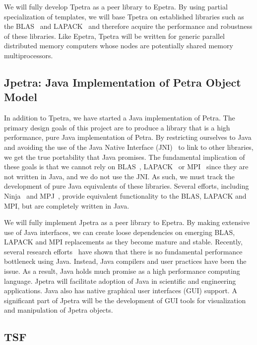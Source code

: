 \documentclass[12pt,strict]{SANDreport}
\begin{document}
We will fully develop Tpetra as a peer library to Epetra. By using partial
specialization of templates, we will base Tpetra on established libraries such as the
BLAS~\cite{BLAS1,BLAS2,BLAS3} and LAPACK~\cite{lapack} and therefore acquire the
performance and robustness of these libraries.
Like Epetra, Tpetra will be written for generic parallel distributed
memory computers whose nodes are
potentially shared memory multiprocessors.

\subsection{Jpetra: Java Implementation of Petra Object Model}

In addition to Tpetra, we have started a Java implementation of Petra.  The primary design
goals of this project are to produce a library that is a high performance, pure Java
implementation of Petra.  By restricting ourselves to Java and avoiding the use of the Java
Native Interface (JNI)~\cite{JNI-site} to link to other libraries, we
get the true portability that Java
promises.  The fundamental implication of these goals is that we cannot rely on
BLAS~\cite{BLAS1,BLAS2,BLAS3}, LAPACK~\cite{lapack} or MPI~\cite{MPI}
since they are not written in Java, and we do not use the JNI.
As such, we must track the development of pure Java equivalents of these libraries.  Several
efforts, including Ninja~\cite{MoreMidkGuptArtiWuAlma2001} and
MPJ~\cite{CarpGetoJuddSkjeFox2000}, provide equivalent functionality to the BLAS, LAPACK and
MPI, but are completely written in Java.

We will fully implement Jpetra as a peer library to Epetra.  By making extensive use of Java
interfaces, we can create loose dependencies on emerging BLAS, LAPACK and MPI replacements as
they become mature and stable.  Recently, several research
efforts~\cite{MoreMidkGuptArtiWuAlma2001,SCIMARK-site}
have shown that there is no fundamental performance bottleneck using Java.  Instead, Java
compilers and user practices have been the issue.  As a result, Java holds much promise as a
high performance computing language.  Jpetra will facilitate adoption of Java in scientific and
engineering applications.   Java also has native graphical user interfaces (GUI) support.  A
significant part of Jpetra will be the development of GUI tools for visualization and
manipulation of Jpetra objects.


\subsection{TSF}
\end{document}
